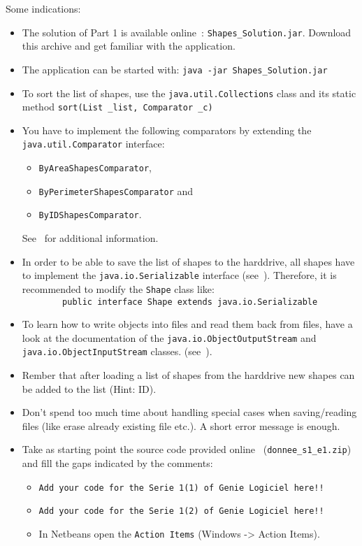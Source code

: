 Some indications:
\begin{itemize}
 \item The solution of Part 1 is available online~\cite{WEBGL}: \texttt{Shapes\_Solution.jar}. Download this archive and get familiar with the application.
 \item The application can be started with: \texttt{java -jar Shapes\_Solution.jar}
 \item To sort the list of shapes, use the \texttt{java.util.Collections} class and its static method \texttt{sort(List \_list, Comparator \_c)}
 \item You have to implement the following comparators by extending the \texttt{java.util.Comparator} interface:
 \begin{itemize}
  \item \texttt{ByAreaShapesComparator},
  \item \texttt{ByPerimeterShapesComparator} and
  \item \texttt{ByIDShapesComparator}.
 \end{itemize}
  See~\cite{WEBGL} for additional information.
  \item In order to be able to save the list of shapes to the harddrive, all shapes have to implement the \texttt{java.io.Serializable} interface (see~\cite{JAVAAPI}). Therefore, it is recommended to modify the \texttt{Shape} class like: \\ \verb"        public interface Shape extends java.io.Serializable"\\
  \item To learn how to write objects into files and read them back from files, have a look at the documentation of the \texttt{java.io.ObjectOutputStream} and \texttt{java.io.ObjectInputStream} classes. (see~\cite{WEBGL}).
  \item Rember that after loading a list of shapes from the harddrive new shapes can be added to the list (Hint: ID).
  \item Don't spend too much time about handling special cases when saving/reading files (like erase already existing file etc.). A short error message is enough.
  \item Take as starting point the source code provided online~\cite{WEBGL} (\texttt{donnee\_s1\_e1.zip}) and fill the gaps indicated by the comments:
  \begin{itemize}
   \item \texttt{Add your code for the Serie 1(1) of Genie Logiciel here!!}
   \item \texttt{Add your code for the Serie 1(2) of Genie Logiciel here!!}
   \item In Netbeans open the \texttt{Action Items} (Windows -> Action Items).
  \end{itemize}

\end{itemize}


